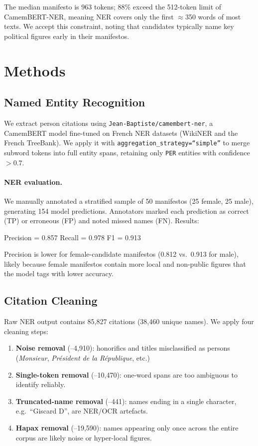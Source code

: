 \documentclass{article}
\begin{document}
The median manifesto is 963 tokens; 88\% exceed the 512-token limit of
CamemBERT-NER, meaning NER covers only the first $\approx$350 words of most
texts. We accept this constraint, noting that candidates typically name key
political figures early in their manifestos.


\section{Methods}

\subsection{Named Entity Recognition}

We extract person citations using \texttt{Jean-Baptiste/camembert-ner}, a
CamemBERT model fine-tuned on French NER datasets (WikiNER and the French
TreeBank). We apply it with \texttt{aggregation\_strategy=``simple''} to merge
subword tokens into full entity spans, retaining only \texttt{PER} entities with
confidence $> 0.7$.

\paragraph{NER evaluation.}
We manually annotated a stratified sample of 50 manifestos (25 female, 25 male),
generating 154 model predictions. Annotators marked each prediction as correct
(TP) or erroneous (FP) and noted missed names (FN). Results:

\begin{center}
  Precision = 0.857 \quad Recall = 0.978 \quad F1 = 0.913
\end{center}

Precision is lower for female-candidate manifestos (0.812 vs.\ 0.913 for male),
likely because female manifestos contain more local and non-public figures that
the model tags with lower accuracy.

\subsection{Citation Cleaning}

Raw NER output contains 85,827 citations (38,460 unique names). We apply four
cleaning steps:

\begin{enumerate}
  \item \textbf{Noise removal} (--4,910): honorifics and titles misclassified as
        persons (\emph{Monsieur}, \emph{Président de la République}, etc.)
  \item \textbf{Single-token removal} (--10,470): one-word spans are too
        ambiguous to identify reliably.
  \item \textbf{Truncated-name removal} (--441): names ending in a single
        character, e.g.\ ``Giscard D'', are NER/OCR artefacts.
  \item \textbf{Hapax removal} (--19,590): names appearing only once across the
        entire corpus are likely noise or hyper-local figures.
\end{enumerate}
\end{document}
